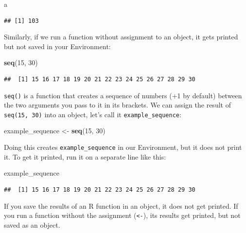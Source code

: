 \documentclass[
  12pt,
  krantz2]{krantz}
\makeatletter
\newenvironment{Shaded}{\begin{snugshade}}{\end{snugshade}}
\newcommand{\DecValTok}[1]{\textcolor[rgb]{0.00,0.00,0.81}{#1}}
\newcommand{\KeywordTok}[1]{\textcolor[rgb]{0.13,0.29,0.53}{\textbf{#1}}}
\newcommand{\NormalTok}[1]{#1}
\newcommand{\StringTok}[1]{\textcolor[rgb]{0.31,0.60,0.02}{#1}}
\renewenvironment{quote}{\begin{VF}}{\end{VF}}
\newenvironment{kframe}{%
\medskip{}
\setlength{\fboxsep}{.8em}
 \def\at@end@of@kframe{}%
 \ifinner\ifhmode%
  \def\at@end@of@kframe{\end{minipage}}%
  \begin{minipage}{\columnwidth}%
 \fi\fi%
 \def\FrameCommand##1{\hskip\@totalleftmargin \hskip-\fboxsep
 \colorbox{shadecolor}{##1}\hskip-\fboxsep
     \hskip-\linewidth \hskip-\@totalleftmargin \hskip\columnwidth}%
 \MakeFramed {\advance\hsize-\width
   \@totalleftmargin\z@ \linewidth\hsize
   \@setminipage}}%
 {\par\unskip\endMakeFramed%
 \at@end@of@kframe}
\renewenvironment{Shaded}{\begin{kframe}}{\end{kframe}}
\makeatother
\begin{document}
\begin{Shaded}
\begin{Highlighting}[]
\NormalTok{a}
\end{Highlighting}
\end{Shaded}

\begin{verbatim}
## [1] 103
\end{verbatim}

Similarly, if we run a function without assignment to an object, it gets printed but not saved in your Environment:

\begin{Shaded}
\begin{Highlighting}[]
\KeywordTok{seq}\NormalTok{(}\DecValTok{15}\NormalTok{, }\DecValTok{30}\NormalTok{)}
\end{Highlighting}
\end{Shaded}

\begin{verbatim}
##  [1] 15 16 17 18 19 20 21 22 23 24 25 26 27 28 29 30
\end{verbatim}

\texttt{seq()} is a function that creates a sequence of numbers (+1 by default) between the two arguments you pass to it in its brackets.
We can assign the result of \texttt{seq(15,\ 30)} into an object, let's call it \texttt{example\_sequence}:

\begin{Shaded}
\begin{Highlighting}[]
\NormalTok{example_sequence <-}\StringTok{ }\KeywordTok{seq}\NormalTok{(}\DecValTok{15}\NormalTok{, }\DecValTok{30}\NormalTok{)}
\end{Highlighting}
\end{Shaded}

Doing this creates \texttt{example\_sequence} in our Environment, but it does not print it.
To get it printed, run it on a separate line like this:

\begin{Shaded}
\begin{Highlighting}[]
\NormalTok{example_sequence}
\end{Highlighting}
\end{Shaded}

\begin{verbatim}
##  [1] 15 16 17 18 19 20 21 22 23 24 25 26 27 28 29 30
\end{verbatim}

\begin{quote}
If you save the results of an R function in an object, it does not get printed.
If you run a function without the assignment (\texttt{\textless{}-}), its results get printed, but not saved as an object.
\end{quote}
\end{document}
